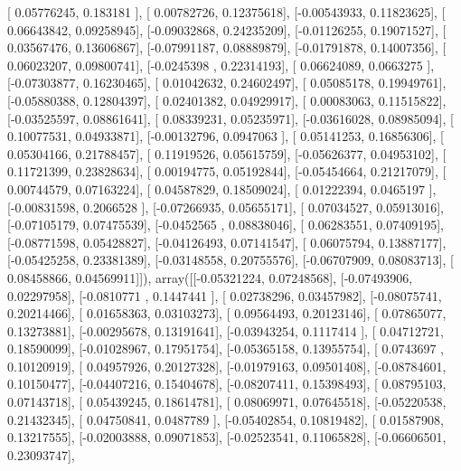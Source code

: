 \documentclass{article}
\begin{document}
       [ 0.05776245,  0.183181  ],
       [ 0.00782726,  0.12375618],
       [-0.00543933,  0.11823625],
       [ 0.06643842,  0.09258945],
       [-0.09032868,  0.24235209],
       [-0.01126255,  0.19071527],
       [ 0.03567476,  0.13606867],
       [-0.07991187,  0.08889879],
       [-0.01791878,  0.14007356],
       [ 0.06023207,  0.09800741],
       [-0.0245398 ,  0.22314193],
       [ 0.06624089,  0.0663275 ],
       [-0.07303877,  0.16230465],
       [ 0.01042632,  0.24602497],
       [ 0.05085178,  0.19949761],
       [-0.05880388,  0.12804397],
       [ 0.02401382,  0.04929917],
       [ 0.00083063,  0.11515822],
       [-0.03525597,  0.08861641],
       [ 0.08339231,  0.05235971],
       [-0.03616028,  0.08985094],
       [ 0.10077531,  0.04933871],
       [-0.00132796,  0.0947063 ],
       [ 0.05141253,  0.16856306],
       [ 0.05304166,  0.21788457],
       [ 0.11919526,  0.05615759],
       [-0.05626377,  0.04953102],
       [ 0.11721399,  0.23828634],
       [ 0.00194775,  0.05192844],
       [-0.05454664,  0.21217079],
       [ 0.00744579,  0.07163224],
       [ 0.04587829,  0.18509024],
       [ 0.01222394,  0.0465197 ],
       [-0.00831598,  0.2066528 ],
       [-0.07266935,  0.05655171],
       [ 0.07034527,  0.05913016],
       [-0.07105179,  0.07475539],
       [-0.0452565 ,  0.08838046],
       [ 0.06283551,  0.07409195],
       [-0.08771598,  0.05428827],
       [-0.04126493,  0.07141547],
       [ 0.06075794,  0.13887177],
       [-0.05425258,  0.23381389],
       [-0.03148558,  0.20755576],
       [-0.06707909,  0.08083713],
       [ 0.08458866,  0.04569911]]), array([[-0.05321224,  0.07248568],
       [-0.07493906,  0.02297958],
       [-0.0810771 ,  0.1447441 ],
       [ 0.02738296,  0.03457982],
       [-0.08075741,  0.20214466],
       [ 0.01658363,  0.03103273],
       [ 0.09564493,  0.20123146],
       [ 0.07865077,  0.13273881],
       [-0.00295678,  0.13191641],
       [-0.03943254,  0.1117414 ],
       [ 0.04712721,  0.18590099],
       [-0.01028967,  0.17951754],
       [-0.05365158,  0.13955754],
       [ 0.0743697 ,  0.10120919],
       [ 0.04957926,  0.20127328],
       [-0.01979163,  0.09501408],
       [-0.08784601,  0.10150477],
       [-0.04407216,  0.15404678],
       [-0.08207411,  0.15398493],
       [ 0.08795103,  0.07143718],
       [ 0.05439245,  0.18614781],
       [ 0.08069971,  0.07645518],
       [-0.05220538,  0.21432345],
       [ 0.04750841,  0.0487789 ],
       [-0.05402854,  0.10819482],
       [ 0.01587908,  0.13217555],
       [-0.02003888,  0.09071853],
       [-0.02523541,  0.11065828],
       [-0.06606501,  0.23093747],
\end{document}
